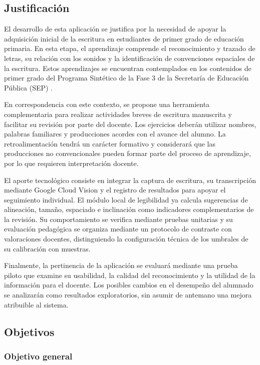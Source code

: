 \subsection{Justificación}
El desarrollo de esta aplicación se justifica por la necesidad de apoyar la adquisición inicial de la escritura en estudiantes de primer grado de educación primaria. En esta etapa, el aprendizaje comprende el reconocimiento y trazado de letras, su relación con los sonidos y la identificación de convenciones espaciales de la escritura. Estos aprendizajes se encuentran contemplados en los contenidos de primer grado del Programa Sintético de la Fase 3 de la Secretaría de Educación Pública (SEP) \cite{sep2024fase3}.

En correspondencia con este contexto, se propone una herramienta complementaria para realizar actividades breves de escritura manuscrita y facilitar su revisión por parte del docente. Los ejercicios deberán utilizar nombres, palabras familiares y producciones acordes con el avance del alumno. La retroalimentación tendrá un carácter formativo y considerará que las producciones no convencionales pueden formar parte del proceso de aprendizaje, por lo que requieren interpretación docente.

El aporte tecnológico consiste en integrar la captura de escritura, su transcripción mediante Google Cloud Vision y el registro de resultados para apoyar el seguimiento individual. El módulo local de legibilidad ya calcula sugerencias de alineación, tamaño, espaciado e inclinación como indicadores complementarios de la revisión. Su comportamiento se verifica mediante pruebas unitarias y su evaluación pedagógica se organiza mediante un protocolo de contraste con valoraciones docentes, distinguiendo la configuración técnica de los umbrales de su calibración con muestras.

Finalmente, la pertinencia de la aplicación se evaluará mediante una prueba piloto que examine su usabilidad, la calidad del reconocimiento y la utilidad de la información para el docente. Los posibles cambios en el desempeño del alumnado se analizarán como resultados exploratorios, sin asumir de antemano una mejora atribuible al sistema.


\subsection{Objetivos}

\subsubsection{Objetivo general}

